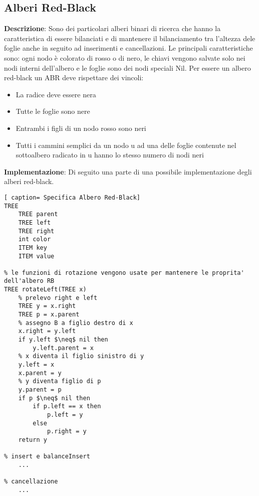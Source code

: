 \documentclass[../cheatSheetAlgoritmi.tex]{subfiles}
\begin{document}
\subsection{Alberi Red-Black}
\textbf{Descrizione}: Sono dei particolari alberi binari di ricerca che hanno la caratteristica di essere bilanciati e di mantenere il bilanciamento tra l'altezza dele foglie anche in seguito ad inserimenti e cancellazioni. Le principali caratteristiche sono: ogni nodo è colorato di rosso o di nero, le chiavi vengono salvate solo nei nodi interni dell'albero e le foglie sono dei nodi speciali Nil. Per essere un albero red-black un ABR deve rispettare dei vincoli:
\begin{itemize}
 	\item La radice deve essere nera
 	\item Tutte le foglie sono nere
 	\item Entrambi i figli di un nodo rosso sono neri
 	\item Tutti i cammini semplici da un nodo u ad una delle foglie contenute nel sottoalbero radicato in u hanno lo stesso numero di nodi neri
\end{itemize}
\textbf{Implementazione}: Di seguito una parte di una possibile implementazione degli alberi red-black.
\begin{lstlisting}[ caption= Specifica Albero Red-Black]
TREE
	TREE parent
	TREE left
	TREE right
	int color
	ITEM key
	ITEM value

% le funzioni di rotazione vengono usate per mantenere le proprita' dell'albero RB	
TREE rotateLeft(TREE x)
	% prelevo right e left
	TREE y = x.right
	TREE p = x.parent
	% assegno B a figlio destro di x
	x.right = y.left 
	if y.left $\neq$ nil then
		y.left.parent = x
	% x diventa il figlio sinistro di y
	y.left = x
	x.parent = y
	% y diventa figlio di p
	y.parent = p
	if p $\neq$ nil then
		if p.left == x then
			p.left = y
		else
			p.right = y
	return y
  	
% insert e balanceInsert 
	...
	
% cancellazione
	...
\end{lstlisting}
\end{document}
